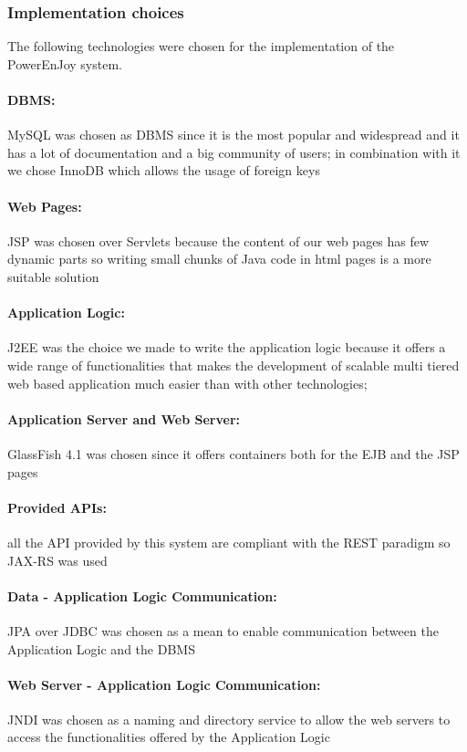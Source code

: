 \subsubsection{Implementation choices}
The following technologies were chosen for the implementation of the PowerEnJoy system.
\paragraph{DBMS:} MySQL was chosen as DBMS since it is the most popular and widespread and it has a lot of documentation and a big community of users; in combination with it we chose InnoDB which allows the usage of foreign keys
\paragraph{Web Pages:} JSP was chosen over Servlets because the content of our web pages has few dynamic parts so writing small chunks of Java code in html pages is a more suitable solution
\paragraph{Application Logic:} J2EE was the choice we made to write the application logic because it offers a wide range of functionalities that makes the development of scalable multi tiered web based application much easier than with other technologies;
\paragraph{Application Server and Web Server:} GlassFish 4.1 was chosen since it offers containers both for the EJB and the JSP pages 
\paragraph{Provided APIs:} all the API provided by this system are compliant with the REST paradigm so JAX-RS was used
\paragraph{Data - Application Logic Communication:} JPA over JDBC was chosen as a mean to enable communication between the Application Logic and the DBMS
\paragraph{Web Server - Application Logic Communication:} JNDI was chosen as a naming and directory service to allow the web servers to access the functionalities offered by the Application Logic
\clearpage
